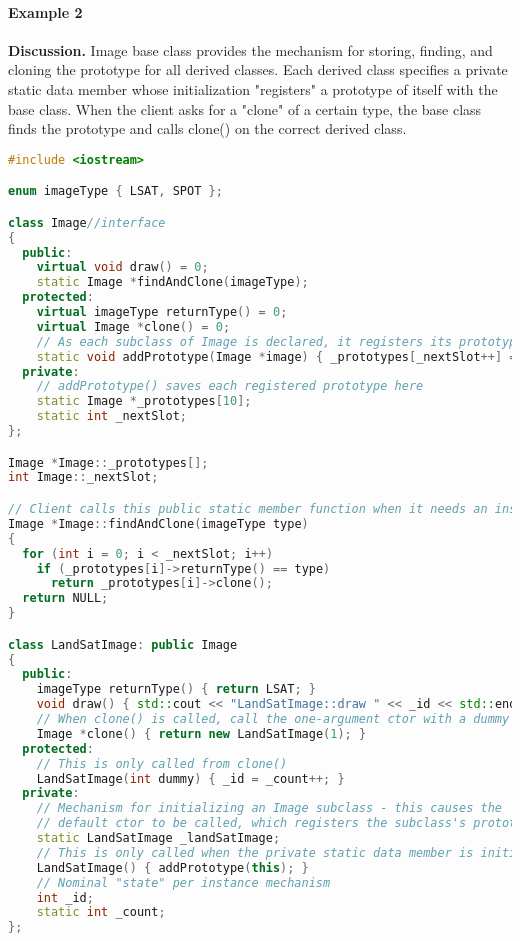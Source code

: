 \documentclass{book}
\begin{document}
\paragraph{Example 2}

\textbf{Discussion.} Image base class provides the mechanism for storing, finding, and cloning the prototype for all derived classes.
Each derived class specifies a private static data member whose initialization "registers" a prototype of itself with the base class.
When the client asks for a "clone" of a certain type, the base class finds the prototype and calls clone() on the correct derived class.

\begin{lstlisting}[caption={Prototype Pattern sample 2},language=C++]
#include <iostream>

enum imageType { LSAT, SPOT };

class Image//interface
{
  public:
    virtual void draw() = 0;
    static Image *findAndClone(imageType);
  protected:
    virtual imageType returnType() = 0;
    virtual Image *clone() = 0;
    // As each subclass of Image is declared, it registers its prototype
    static void addPrototype(Image *image) { _prototypes[_nextSlot++] = image; }
  private:
    // addPrototype() saves each registered prototype here
    static Image *_prototypes[10];
    static int _nextSlot;
};

Image *Image::_prototypes[];
int Image::_nextSlot;

// Client calls this public static member function when it needs an instance of an Image subclass
Image *Image::findAndClone(imageType type)
{
  for (int i = 0; i < _nextSlot; i++)
    if (_prototypes[i]->returnType() == type)
      return _prototypes[i]->clone();
  return NULL;
}

class LandSatImage: public Image
{
  public:
    imageType returnType() { return LSAT; }
    void draw() { std::cout << "LandSatImage::draw " << _id << std::endl; }
    // When clone() is called, call the one-argument ctor with a dummy arg
    Image *clone() { return new LandSatImage(1); }
  protected:
    // This is only called from clone()
    LandSatImage(int dummy) { _id = _count++; }
  private:
    // Mechanism for initializing an Image subclass - this causes the
    // default ctor to be called, which registers the subclass's prototype
    static LandSatImage _landSatImage;
    // This is only called when the private static data member is initiated
    LandSatImage() { addPrototype(this); }
    // Nominal "state" per instance mechanism
    int _id;
    static int _count;
};


\end{lstlisting}
\end{document}
